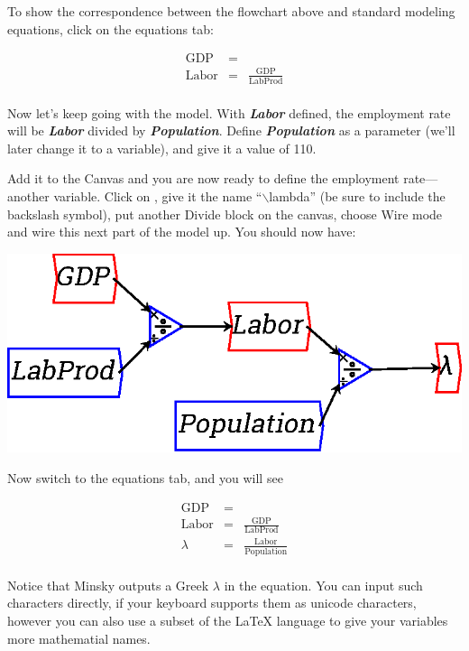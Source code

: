 To show the correspondence between the flowchart above and standard
modeling equations, click on the equations tab: 

\begin{eqnarray*}
\mathrm{GDP}&=&\\
\mathrm{Labor}&=&\frac{\mathrm{GDP}}{\mathrm{LabProd}}\\
\end{eqnarray*}

Now let's keep going with the model. With {\bf\em Labor} defined, the
employment rate will be {\bf\em  Labor} divided by {\bf\em
Population}. Define {\bf\em Population} as a parameter (we'll later
change it to a variable), and give it a value of 110. 

\begin{center}
\end{center}

Add it to the Canvas and you are now ready to define the employment
rate---another variable. Click on , give it
the name ``$\backslash$lambda'' (be sure to include the backslash symbol), put
another Divide block on the canvas, choose Wire mode and wire this
next part of the model up. You should now have:

\begin{center}
\includegraphics{images/NewItem83.eps}
\end{center}


Now switch to the equations tab, and you will see

\begin{eqnarray*}
\mathrm{GDP}&=&\\
\mathrm{Labor}&=&\frac{\mathrm{GDP}}{\mathrm{LabProd}}\\
\lambda&=&\frac{\mathrm{Labor}}{\mathrm{Population}}\\
\end{eqnarray*}

Notice that Minsky outputs a Greek $\lambda$ in the equation. You can
input such characters directly, if your keyboard supports them as unicode
characters, however you can also use a subset of the LaTeX language to give
your variables more mathematial names.


